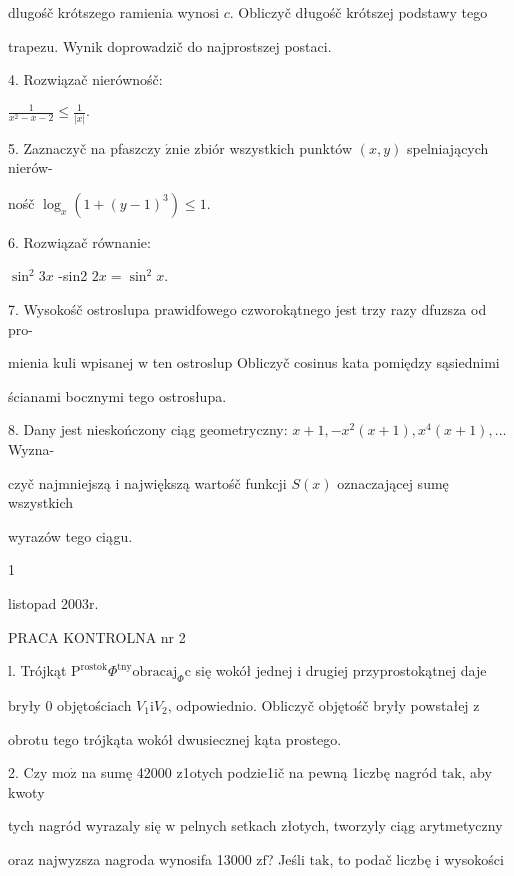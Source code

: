 \documentclass[a4paper,12pt]{article}
\begin{document}
dlugośč krótszego ramienia wynosi $c$. Obliczyč długośč krótszej podstawy tego

trapezu. Wynik doprowadzič do najprostszej postaci.

4. Rozwiązač nierównośč:

$\displaystyle \frac{1}{x^{2}-x-2}\leq\frac{1}{|x|}.$

5. Zaznaczyč na pfaszczy $\acute{\mathrm{z}}\mathrm{n}\mathrm{i}\mathrm{e}$ zbiór wszystkich punktów $(x,y)$ spelniających nierów-

nośč $\log_{x}(1+(y-1)^{3})\leq 1.$

6. Rozwiązač równanie:

$\sin^{2}3x$ -sin2 $2x=\sin^{2}x.$

7. Wysokośč ostroslupa prawidfowego czworokątnego jest trzy razy dfuzsza od pro-

mienia kuli wpisanej $\mathrm{w}$ ten ostroslup Obliczyč cosinus kata pomiędzy sąsiednimi

ścianami bocznymi tego ostrosłupa.

8. Dany jest nieskończony ciąg geometryczny: $x+1, -x^{2}(x+1), x^{4}(x+1), \ldots$ Wyzna-

czyč najmniejszą $\mathrm{i}$ największą wartośč funkcji $S(x)$ oznaczającej sumę wszystkich

wyrazów tego ciągu.

1




listopad 2003r.

PRACA KONTROLNA nr 2

l. Trójkąt $\mathrm{P}^{\mathrm{r}\mathrm{o}\mathrm{s}\mathrm{t}\mathrm{o}\mathrm{k}}\Phi^{\mathrm{t}\mathrm{n}\mathrm{y}} \mathrm{o}\mathrm{b}\mathrm{r}\mathrm{a}\mathrm{c}\mathrm{a}\mathrm{j}_{\Phi}\mathrm{c}$ się wokół jednej $\mathrm{i}$ drugiej przyprostokątnej daje

bryły $0$ objętościach $V_{1} \mathrm{i} V_{2}$, odpowiednio. Obliczyč objętośč bryły powstałej $\mathrm{z}$

obrotu tego trójkąta wokół dwusiecznej kąta prostego.

2. Czy $\mathrm{m}\mathrm{o}\dot{\mathrm{z}}$ na sumę 42000 z1otych podzie1ič na pewną 1iczbę nagród $\mathrm{t}\mathrm{a}\mathrm{k}$, aby kwoty

tych nagród wyrazaly się $\mathrm{w}$ pelnych setkach złotych, tworzyly ciąg arytmetyczny

oraz najwyzsza nagroda wynosifa 13000 $\mathrm{z}\mathrm{f}$? Jeśli $\mathrm{t}\mathrm{a}\mathrm{k}$, to podač liczbę $\mathrm{i}$ wysokości
\end{document}
